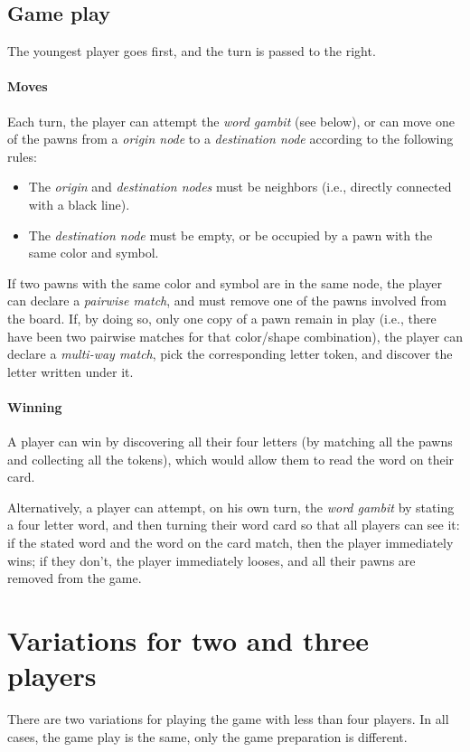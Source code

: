 \documentclass[12pt]{article}
\begin{document}
\subsection*{Game play}
The youngest player goes first, and the turn is passed to the right.
\paragraph{Moves}
Each turn, the player can attempt the \emph{word gambit} (see below), or can move one of the pawns from a \emph{origin node} to a \emph{destination node} according to the following rules:
\begin{itemize}
\item The \emph{origin} and \emph{destination nodes} must be neighbors (i.e., directly connected with a black line).
\item The \emph{destination node} must be empty, or be occupied by a pawn with the same color and symbol.
\end{itemize}
If two pawns with the same color and symbol are in the same node, the player can declare a \emph{pairwise match}, and must remove one of the pawns involved from the board. If, by doing so, only one copy of a pawn remain in play (i.e., there have been two pairwise matches for that color/shape combination), the player can declare a \emph{multi-way match}, pick the corresponding letter token, and discover the letter written under it.
\paragraph{Winning}
A player can win by discovering all their four letters (by matching all the pawns and collecting all the tokens), which would allow them to read the word on their card.

Alternatively, a player can attempt, on his own turn, the \emph{word gambit} by stating a four letter word, and then turning their word card so that all players can see it: if the stated word and the word on the card match, then the player immediately wins; if they don't, the player immediately looses, and all their pawns are removed from the game.

\section*{Variations for two and three players}
There are two variations for playing the game with less than four players. In all cases, the game play is the same, only the game preparation is different.
\end{document}
